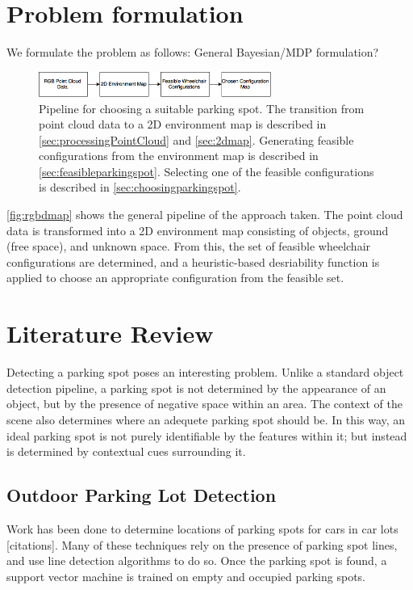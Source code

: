 \section{Problem formulation}
We formulate the problem as follows: General Bayesian/MDP formulation?

\begin{figure}
\centering
\includegraphics[width=3in]{figures/rgbdmap.png}
\caption{Pipeline for choosing a suitable parking spot.
The transition from point cloud data to a 2D environment map is described in
\autoref{sec:processingPointCloud} and \autoref{sec:2dmap}. Generating feasible configurations from the
environment map is described in \autoref{sec:feasibleparkingspot}. Selecting one
of the feasible configurations is described in
\autoref{sec:choosingparkingspot}.}
\label{fig:rgbdmap}
\end{figure}

\autoref{fig:rgbdmap} shows the general pipeline of the approach taken. The
point cloud data is transformed into a 2D environment map consisting of objects,
ground (free space), and unknown space. From this, the set of feasible
wheelchair configurations are determined, and a heuristic-based desriability
function is applied to choose an appropriate configuration from the feasible set.



\section{Literature Review}
\label{sec:parkinglotidentificationlitreview}
Detecting a parking spot poses an interesting problem. Unlike a standard object
detection pipeline, a parking spot is not determined by the appearance of an
object, but by the presence of negative space within an area. The context of the
scene also determines where an adequete parking spot should be. In this way, an
ideal parking spot is not purely identifiable by the features within it; but
instead is determined by contextual cues surrounding it.


\subsection{Outdoor Parking Lot Detection}
Work has been done to determine locations of parking spots for cars in car lots
[citations]. Many of these techniques rely on the presence of parking spot
lines, and use line detection algorithms to do so. Once the parking spot is
found, a support vector machine is trained on empty and occupied parking spots.

